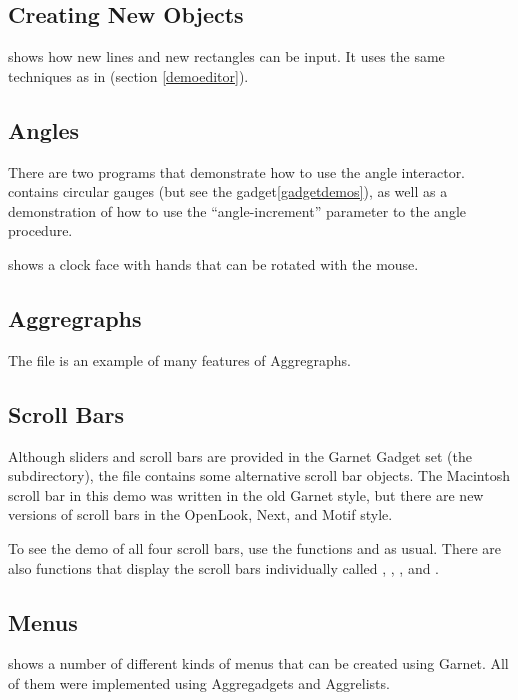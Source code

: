 \subsection{Creating New Objects}

 shows how new lines and new rectangles can be input.  It
uses the same techniques as in  (section \ref{demoeditor}).

\subsection{Angles}
There are two programs that demonstrate how to use the angle interactor.
 contains circular gauges (but see the 
gadget\dashsection \ref{gadgetdemos}), as
well as a demonstration of how to use the ``angle-increment''
parameter to the angle  procedure.

 shows a clock face with hands that can be rotated with the
mouse.


\subsection{Aggregraphs}
The  file is an example of many features of Aggregraphs.


\subsection{Scroll Bars}
Although sliders and scroll bars are provided in the Garnet Gadget set
(the  subdirectory), the file  contains
some alternative scroll bar objects.  The Macintosh scroll bar in this demo
was written in the old Garnet style, but there are new versions of scroll bars
in the OpenLook, Next, and Motif style.

To see the demo of all four scroll bars, use the functions
 and  as usual.  There
are also functions that display the scroll bars individually called
, , , and .


\subsection{Menus}
 shows a number of different kinds of menus that can be
created using Garnet.  All of them were implemented using Aggregadgets and
Aggrelists.


